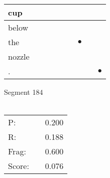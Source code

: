 \documentclass[landscape]{article}
\newcommand{\ssp}{\hspace{2pt}}
\newcommand{\mex}{\cellcolor{g}$\bullet$}
\begin{document}
\begin{tabular}{|l|p{10pt}|p{10pt}|p{10pt}|p{10pt}|p{10pt}|p{10pt}|p{10pt}|p{10pt}|}
\hline
\ssp cup \ssp&\hspace{2pt}&\hspace{2pt}&\hspace{2pt}&\hspace{2pt}&\hspace{2pt}&\hspace{2pt}&\hspace{2pt}&\hspace{2pt}\\
\hline
\ssp below \ssp&\hspace{2pt}&\hspace{2pt}&\hspace{2pt}&\hspace{2pt}&\hspace{2pt}&\hspace{2pt}&\hspace{2pt}&\hspace{2pt}\\
\hline
\ssp \cellcolor{ref5}the \ssp&\hspace{2pt}&\hspace{2pt}&\hspace{2pt}&\hspace{2pt}&\hspace{2pt}&\hspace{2pt}\mex&\hspace{2pt}&\hspace{2pt}\\
\hline
\ssp nozzle \ssp&\hspace{2pt}&\hspace{2pt}&\hspace{2pt}&\hspace{2pt}&\hspace{2pt}&\hspace{2pt}&\hspace{2pt}&\hspace{2pt}\\
\hline
\ssp \cellcolor{ref7}. \ssp&\hspace{2pt}&\hspace{2pt}&\hspace{2pt}&\hspace{2pt}&\hspace{2pt}&\hspace{2pt}&\hspace{2pt}&\hspace{2pt}\mex\\
\hline
\end{tabular}

\vspace{6pt}
\noindent Segment 184\\\\
\noindent\begin{tabular}{lm{12pt}r}
\hline
P:&&0.200\\
R:&&0.188\\
Frag:&&0.600\\
Score:&&0.076\\
\end{tabular}
\end{document}
